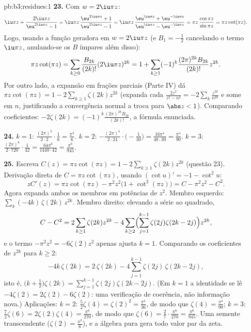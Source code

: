 \begin{solution}{pb:b3:residues:1}
\textbf{23.} Com $w = 2\iu\pi z$:
\[
\iu\pi z + \frac{2\iu\pi z}{\eu^{2\iu\pi z} - 1}
= \iu\pi z\,\frac{\eu^{2\iu\pi z} + 1}{\eu^{2\iu\pi z} - 1}
= \iu\pi z\,\frac{\eu^{\iu\pi z} +
\eu^{-\iu\pi z}}{\eu^{\iu\pi z} - \eu^{-\iu\pi z}}
= \pi z\,\frac{\cos\pi z}{\sin\pi z} = \pi z\cot(\pi z) .
\]
Logo, usando a função geradora em $w = 2\iu\pi z$ (e
$B_1 = -\frac12$ cancelando o termo $\iu\pi z$, anulando-se os $B$ ímpares
além disso):
\[
\pi z\cot(\pi z) = \sum_{k\geq0}\frac{B_{2k}}{(2k)!}
(2\iu\pi z)^{2k}
= 1 + \sum_{k\geq1}(-1)^k\frac{(2\pi)^{2k}B_{2k}}{(2k)!}
z^{2k} .
\]
Por outro lado, a expansão em frações parciais (Parte IV)
dá $\pi z\cot(\pi z) = 1 - 2\sum_{k\geq1}\zeta(2k)z^{2k}$
(expanda cada $\frac{2z^2}{z^2 - n^2} =
-2\sum_k\frac{z^{2k}}{n^{2k}}$ e some em $n$, justificando a convergência
normal a troca para $\abs z < 1$).
Comparando coeficientes: $-2\zeta(2k) =
(-1)^k\frac{(2\pi)^{2k}B_{2k}}{(2k)!}$, a fórmula enunciada.

\textbf{24.} $k = 1$: $\frac{(2\pi)^2}{2\cdot2}\cdot\frac16
= \frac{\pi^2}6$. $k = 2$: $-\frac{(2\pi)^4}{2\cdot24}
\cdot\bigl(-\frac1{30}\bigr) = \frac{16\pi^4}{48\cdot30} =
\frac{\pi^4}{90}$. $k = 3$: $\frac{(2\pi)^6}{2\cdot720}
\cdot\frac1{42} = \frac{64\pi^6}{1440\cdot42} =
\frac{\pi^6}{945}$.

\textbf{25.} Escreva $C(z) = \pi z\cot(\pi z) = 1 -
2\sum_{k\geq1}\zeta(2k)z^{2k}$ (questão 23). Derivação
direta de $C = \pi z\cot(\pi z)$, usando $(\cot u)'
= -1 - \cot^2u$:
\[
zC'(z) = \pi z\cot(\pi z) - \pi^2z^2\bigl(1 +
\cot^2(\pi z)\bigr) = C - \pi^2z^2 - C^2 .
\]
Agora expanda ambos os membros em potências de $z^2$. Membro esquerdo:
$\sum_k(-4k)\,\zeta(2k)\,z^{2k}$. Membro direito: elevando a série ao
quadrado,
\[
C - C^2 = 2\sum_{k\geq1}\zeta(2k)z^{2k}
- 4\sum_{k\geq2}\Bigl(\sum_{j=1}^{k-1}\zeta(2j)
\zeta(2k-2j)\Bigr)z^{2k},
\]
e o termo $-\pi^2z^2 = -6\zeta(2)z^2$ apenas ajusta $k =
1$. Comparando os coeficientes de $z^{2k}$ para $k \geq 2$:
\[
-4k\,\zeta(2k) = 2\,\zeta(2k) -
4\sum_{j=1}^{k-1}\zeta(2j)\,\zeta(2k-2j),
\]
isto é, $\bigl(k + \frac12\bigr)\zeta(2k) =
\sum_{j=1}^{k-1}\zeta(2j)\zeta(2k-2j)$. (Em $k = 1$ a
identidade se lê $-4\zeta(2) = 2\zeta(2) - 6\zeta(2)$: uma
verificação de coerência, não informação nova.) Aplicações: $k =
2$: $\frac52\zeta(4) = \zeta(2)^2 = \frac{\pi^4}{36}$, de modo que
$\zeta(4) = \frac{\pi^4}{90}$; $k = 3$: $\frac72\zeta(6) =
2\zeta(2)\zeta(4) = \frac{\pi^6}{270}$, de modo que $\zeta(6) =
\frac{2}{7}\cdot\frac{\pi^6}{270} = \frac{\pi^6}{945}$. Uma
semente transcendente ($\zeta(2) = \frac{\pi^2}6$), e a álgebra pura
gera todo valor par da zeta.
\end{solution}
